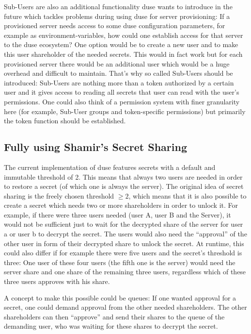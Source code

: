 Sub-Users are also an additional functionality duse wants to introduce in
the future which tackles problems during using duse for server provisioning:
If a provisioned server needs access to some duse configuration parameters,
for example as environment-variables, how could one establish access for that server
to the duse ecosystem? One option would be to create a new user and to make
this user shareholder of the needed secrets. This would in fact work but for
each provisioned server there would be an additional user which would be a
huge overhead and difficult to maintain. That's why so called Sub-Users should
be introduced: Sub-Users are nothing more than a token authorized by a certain
user and it gives access to reading all secrets that user can read with the
user's permissions. One could also think of a permission system with finer
granularity here (for example, Sub-User groups and token-specific permissions)
but primarily the token function should be established.

\subsection{Fully using Shamir's Secret Sharing}

The current implementation of duse features secrets with a default and 
immutable threshold of 2. This means that always two users are needed in
order to restore a secret (of which one is always the server). The original
idea of secret sharing is the freely chosen threshold $\geq 2$, which
means that it is also possible to create a secret which needs two or more
shareholders in order to unlock it. For example, if there were three users
needed (user A, user B and the Server), it would not be sufficient just to
wait for the decrypted share of the server for user a or user b to decrypt
the secret. The users would also need the ``approval'' of the other user
in form of their decrypted share to unlock the secret. At runtime, this could
also differ if for example there were five users and the secret's threshold
is three: One user of these four users (the fifth one is the server) would
need the server share and one share of the remaining three users, regardless
which of these three users approves with his share.

A concept to make this possible could be queues: If one wanted
approval for a secret, one could demand approval from the other needed
shareholders. The other shareholders can then ``approve'' and send their
shares to the queue of the demanding user, who was waiting for these shares
to decrypt the secret.

